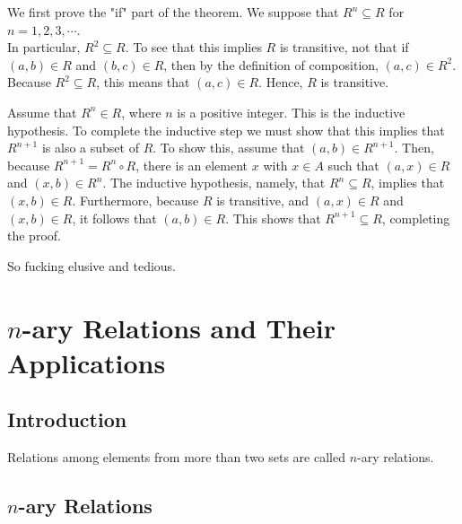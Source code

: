 \documentclass{report}
\begin{document}
\begin{myproof}
    \par
    We first prove the "if" part of the theorem. We suppose that $R^n \subseteq R$ for $n=1,2,3,\cdots$.\\
    In particular, $R^2\subseteq R$. To see that this implies $R$ is transitive, not that if $(a,b)\in R$
    and $(b,c)\in R$, then by the definition of composition, $(a,c)\in R^2$. Because $R^2\subseteq R$, this
    means that $(a,c)\in R$. Hence, $R$ is transitive.
    \par
    Assume that $R^n\in R$, where $n$ is a positive integer. This is the inductive hypothesis. To complete the
    inductive step we must show that this implies that $R^{n+1}$ is also a subset of $R$. To show this, assume
    that $(a,b)\in R^{n+1}$. Then, because $R^{n+1}=R^n\circ R$, there is an element $x$ with $x\in A$
    such that $(a,x)\in R$ and $(x,b)\in R^n$. The inductive hypothesis, namely, that $R^n\subseteq R$,
    implies that $(x,b)\in R$. Furthermore, because $R$ is transitive, and $(a,x)\in R$ and $(x,b)\in R$, 
    it follows that $(a,b)\in R$. This shows that $R^{n+1}\subseteq R$, completing the proof.
\end{myproof}
So fucking elusive and tedious.

\section{$n$-ary Relations and Their Applications}
\subsection{Introduction}
Relations among elements from more than two sets are called $n$-ary relations.

\subsection{$n$-ary Relations}
\end{document}
